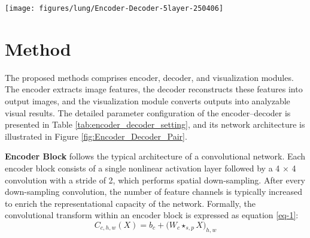 \documentclass[a4paper, times, 10pt,twocolumn]{article}
\begin{document}
\begin{figure*}[t!]
	\centering
	\texttt{[image: figures/lung/Encoder-Decoder-5layer-250406]}
	\caption[architecture]{Schematic Diagram of Data Flow Within the Model. The PET image is shown on the left, and the CT image on the right. The blue modules correspond to the encoder architecture, while the orange modules represent the decoder architecture. The upper portion of the figure illustrates the fundamental structures of the encoder blocks, decoder blocks, and visualization blocks. The connections in the lower portion indicate the skip connections.}
	\label{fig:Encoder_Decoder_Pair}
\end{figure*}

\section{Method}
The proposed methods comprises encoder, decoder, and visualization modules. The encoder extracts image features, the decoder reconstructs these features into output images, and the visualization module converts outputs into analyzable visual results. The detailed parameter configuration of the encoder–decoder is presented in Table \ref{tab:encoder_decoder_setting}, and its network architecture is illustrated in Figure \ref{fig:Encoder_Decoder_Pair}.

\textbf{Encoder Block} follows the typical architecture of a convolutional network.
Each encoder block consists of a single nonlinear activation layer followed by a 4 × 4 convolution with a stride of 2, which performs spatial down-sampling. After every down-sampling convolution, the number of feature channels is typically increased to enrich the representational capacity of the network. Formally, the convolutional transform within an encoder block is expressed as equation \eqref{eq-1}:
\begin{equation}
	\label{eq-1}
	C_{c,h,w}(X)= b_{c} + \bigl(W_{c} \star_{s,p} X\bigr)_{h,w}
\end{equation}
\end{document}
